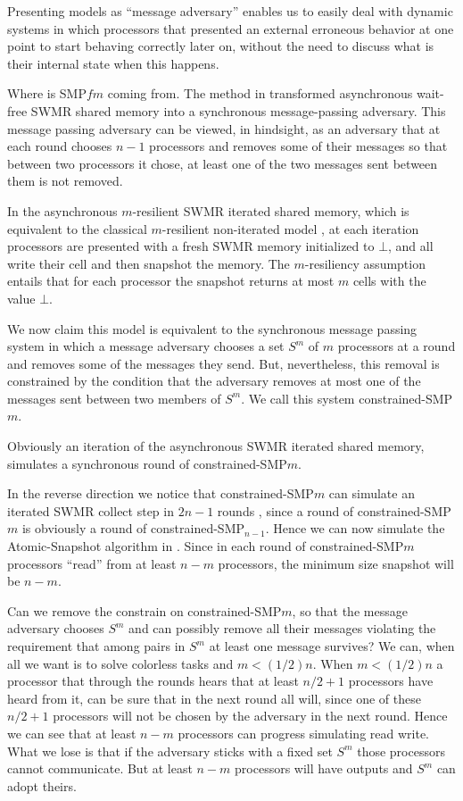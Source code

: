 \documentclass[11pt]{article}
\newcommand{\SMPfm}{\mbox{SMP\!$f\!m$}\xspace}
\newcommand{\SMPm}{\mbox{SMP$m$}\xspace}
\begin{document}
Presenting models as ``message adversary'' enables us to easily deal with dynamic systems in which processors that  presented an external erroneous behavior at one point to start behaving correctly later on, without the need to discuss what is their internal state when this happens.

Where is \SMPfm coming from.
The method in \cite{AG15} transformed asynchronous wait-free SWMR shared memory into a synchronous message-passing adversary.
This message passing adversary can be viewed, in hindsight, as an adversary that at each round chooses $n-1$ processors
and removes some of their messages so that between two processors it chose, at least one of the two messages sent between
them is not removed.


In the asynchronous $m$-resilient SWMR iterated shared memory, which is equivalent to the classical $m$-resilient 
non-iterated model \cite{BG97,tasks,HR10}, 
at each iteration processors are presented with a fresh SWMR memory initialized to $\bot$,
and all write their cell and then snapshot the memory. The $m$-resiliency assumption entails that for each processor
the snapshot returns at most $m$ cells with the value $\bot$.

We now claim this model is equivalent to the synchronous message passing system in which a message adversary chooses
a set $S^m$ of
$m$ processors at a round and removes some of the messages they send. But, nevertheless, this removal is constrained
by the condition that the adversary removes at most one of the messages sent between two members of $S^m$.
We call this system constrained-\SMPm.

Obviously an iteration of the asynchronous SWMR iterated shared memory, simulates a synchronous round of  constrained-\SMPm.

In the reverse direction we notice that constrained-\SMPm can simulate an iterated SWMR collect step in $2n-1$ rounds \cite{AG15},
since a round of  constrained-\SMPm is obviously a round of  constrained-SMP$_{n-1}$.
Hence we can now simulate the Atomic-Snapshot algorithm in \cite{Afek:1993}.
Since in each round of constrained-\SMPm processors ``read'' from at least $n-m$ processors,
the minimum size snapshot will be $n-m$.

Can we remove the constrain on constrained-\SMPm, so that the message adversary chooses $S^m$ and can possibly remove
all their messages violating the requirement that among pairs in $S^m$ at least one message survives?
We can, when all we want is to solve colorless tasks and $m<(1/2)n$.
When $m<(1/2)n$ a processor that through the rounds hears that at least
$n/2+1$ processors have heard from it, can be sure that in the next round all will, since
one of these $n/2+1$ processors will not be chosen by the adversary in the next round.
Hence we can see that at least $n-m$ processors can progress simulating read write.
What we lose is that if the adversary sticks with a fixed set $S^m$ those
processors cannot communicate. 
But at least $n-m$ processors will have outputs and $S^m$ can adopt theirs.
\end{document}
